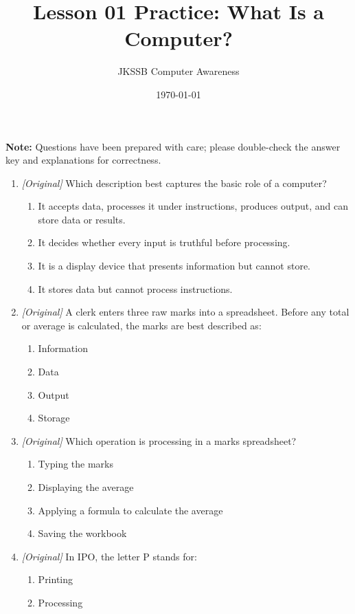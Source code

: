 \documentclass[11pt]{article}
\title{Lesson 01 Practice: What Is a Computer?}
\author{JKSSB Computer Awareness}
\date{\today}
\begin{document}
\maketitle
\noindent\textbf{Note:} Questions have been prepared with care; please
double-check the answer key and explanations for correctness.

\begin{enumerate}[label=\textbf{Q\arabic*.}, leftmargin=*]
\item \textit{[Original]} Which description best captures the basic role of
  a computer?
  \begin{enumerate}[label=\Alph*.]
    \item It accepts data, processes it under instructions, produces output,
      and can store data or results.
    \item It decides whether every input is truthful before processing.
    \item It is a display device that presents information but cannot store.
    \item It stores data but cannot process instructions.
  \end{enumerate}
\item \textit{[Original]} A clerk enters three raw marks into a spreadsheet.
  Before any total or average is calculated, the marks are best described as:
  \begin{enumerate}[label=\Alph*.]
    \item Information
    \item Data
    \item Output
    \item Storage
  \end{enumerate}
\item \textit{[Original]} Which operation is processing in a marks
  spreadsheet?
  \begin{enumerate}[label=\Alph*.]
    \item Typing the marks
    \item Displaying the average
    \item Applying a formula to calculate the average
    \item Saving the workbook
  \end{enumerate}
\item \textit{[Original]} In IPO, the letter P stands for:
  \begin{enumerate}[label=\Alph*.]
    \item Printing
    \item Processing

\end{enumerate}
\end{enumerate}
\end{document}
